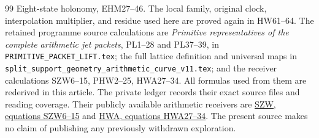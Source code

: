 \documentclass[11pt,a4paper]{article}
\theoremstyle{definition}\newtheorem{definition}[theorem]{Definition}
\begin{document}
\begin{thebibliography}{99}
{Eight-state holonomy, EHM27--46}.
The local family, original clock, interpolation multiplier,
and residue used here are proved again in HW61--64.
The retained programme source calculations are
\emph{Primitive representatives of the complete arithmetic jet packets},
PL1--28 and PL37--39, in
\texttt{PRIMITIVE\_PACKET\_LIFT.tex};
the full lattice definition and universal maps in
\texttt{split\_support\_geometry\_arithmetic\_curve\_v11.tex};
and the receiver calculations SZW6--15,
PHW2--25, HWA27--34.
All formulas used from them are rederived in this article.
The private ledger records their exact source files and reading
coverage. Their publicly available arithmetic receivers are
\href{https://github.com/KokunoYumeto/zeta-function-research-reader/blob/adfbfe74fa49e31cb7aa068cf755fb083be37c32/workbenches/splitzero-tandem/branches/tau-zero-prime-positivity/SUPPORTED_ZERO_PRIME_WEIL_DERIVATION.md}
{SZW, equations SZW6--15}
and
\href{https://github.com/KokunoYumeto/zeta-function-research-reader/blob/d5c9d198a8432e3ede468b280162a99c00e3f4f7/workbenches/splitzero-tandem/branches/tau-zero-prime-positivity/HOLONOMY_AVERAGING_WEIL_ENDPOINT_DERIVATION.md}
{HWA, equations HWA27--34}.
The present source makes no claim of publishing any previously
withdrawn exploration.
\end{thebibliography}
\end{document}
